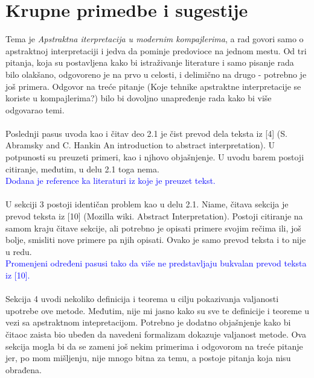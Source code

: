 \documentclass[a4paper]{report}
\newcommand{\odgovor}[1]{\textcolor{blue}{#1}}
\begin{document}
\section{Krupne primedbe i sugestije}
\label{sec: primedbe}
Tema je \textit{Apstraktna iterpretacija u modernim kompajlerima}, a rad govori samo o apstraktnoj interpretaciji i jedva da pominje predovioce na jednom mestu. Od tri pitanja, koja su postavljena kako bi istraživanje literature i samo pisanje rada bilo olakšano, odgovoreno je na prvo u celosti, i delimično na drugo - potrebno je još primera. Odgovor na treće pitanje (Koje tehnike apstraktne interpretacije se koriste u kompajlerima?) bilo bi dovoljno unapređenje rada kako bi više odgovarao temi.
\\
\\
Poslednji pasus uvoda kao i čitav deo 2.1 je čist prevod dela teksta iz [4] (S. Abramsky and C. Hankin An introduction to abstract interpretation). U potpunosti su preuzeti primeri, kao i njhovo objašnjenje. U uvodu barem postoji citiranje, međutim, u delu 2.1 toga nema.
\\
  \odgovor{Dodana je reference ka literaturi iz koje je preuzet tekst.}
\\
\\
U sekciji 3 postoji identičan problem kao u delu 2.1. Niame, čitava sekcija je prevod teksta iz [10] (Mozilla wiki. Abstract Interpretation). Postoji citiranje na samom kraju čitave sekcije, ali potrebno je opisati primere svojim rečima ili, još bolje, smisliti nove primere pa njih opisati. Ovako je samo prevod teksta i to nije u redu. 
\\
 \odgovor{Promenjeni određeni pasusi tako da više ne predstavljaju bukvalan prevod teksta iz [10].}
\\
\\
Sekcija 4 uvodi nekoliko definicija i teorema u cilju pokazivanja valjanosti upotrebe ove metode. Međutim, nije mi jasno kako su sve te definicije i teoreme u vezi sa apstraktnom intepretacijom. Potrebno je dodatno objašnjenje kako bi čitaoc zaista bio ubeđen da navedeni formalizam dokazuje valjanost metode. Ova sekcija mogla bi da se zameni još nekim primerima i odgovorom na treće pitanje jer, po mom mišljenju, nije mnogo bitna za temu, a postoje pitanja koja nisu obrađena. 
\end{document}
